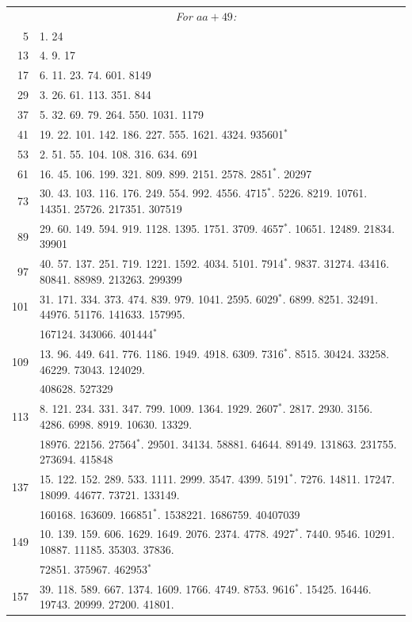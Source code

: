 \documentclass[10pt,a4paper]{article}
\begin{document}
\begin{center}
\begin{tabular}{r | l}
\multicolumn{2}{c}{\textit{For $aa+49$:}} \\
5 & 1. 24 \\
13 & 4. 9. 17 \\
17 & 6. 11. 23. 74. 601. 8149 \\
29 & 3. 26. 61. 113. 351. 844 \\
37 & 5. 32. 69. 79. 264. 550. 1031. 1179 \\
41 & 19. 22. 101. 142. 186. 227. 555. 1621. 4324. 935601$^*$ \\
53 & 2. 51. 55. 104. 108. 316. 634. 691 \\
61 & 16. 45. 106. 199. 321. 809. 899. 2151. 2578. 2851$^*$. 20297 \\
73 & 30. 43. 103. 116. 176. 249. 554. 992. 4556. 4715$^*$. 5226. 8219. 10761. 14351. 25726. 217351. 307519 \\
89 & 29. 60. 149. 594. 919. 1128. 1395. 1751. 3709. 4657$^*$. 10651. 12489. 21834. 39901 \\
97 & 40. 57. 137. 251. 719. 1221. 1592. 4034. 5101. 7914$^*$. 9837. 31274. 43416. 80841. 88989. 213263. 299399 \\
101 & 31. 171. 334. 373. 474. 839. 979. 1041. 2595. 6029$^*$. 6899. 8251. 32491. 44976. 51176. 141633. 157995. \\
    & 167124. 343066. 401444$^*$ \\
109 & 13. 96. 449. 641. 776. 1186. 1949. 4918. 6309. 7316$^*$. 8515. 30424. 33258. 46229. 73043. 124029. \\
    & 408628. 527329 \\
113 & 8. 121. 234. 331. 347. 799. 1009. 1364. 1929. 2607$^*$. 2817. 2930. 3156. 4286. 6998. 8919. 10630. 13329. \\
    & 18976. 22156. 27564$^*$. 29501. 34134. 58881. 64644. 89149. 131863. 231755. 273694. 415848 \\
137 & 15. 122. 152. 289. 533. 1111. 2999. 3547. 4399. 5191$^*$. 7276. 14811. 17247. 18099. 44677. 73721. 133149. \\
    & 160168. 163609. 166851$^*$. 1538221. 1686759. 40407039 \\
149 & 10. 139. 159. 606. 1629. 1649. 2076. 2374. 4778. 4927$^*$. 7440. 9546. 10291. 10887. 11185. 35303. 37836. \\
    & 72851. 375967. 462953$^*$ \\
157 & 39. 118. 589. 667. 1374. 1609. 1766. 4749. 8753. 9616$^*$. 15425. 16446. 19743. 20999. 27200. 41801. \\

\end{tabular}
\end{center}
\end{document}
